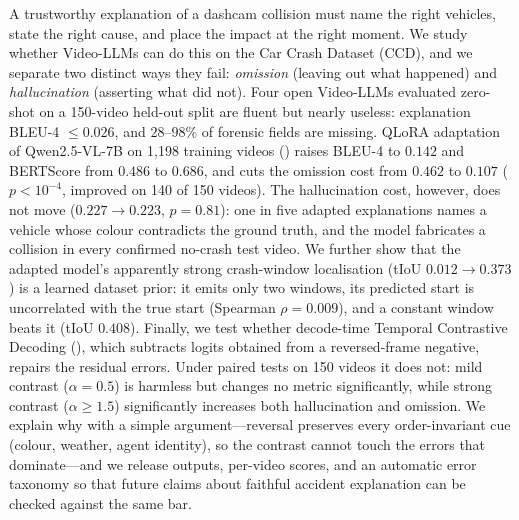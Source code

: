 A trustworthy explanation of a dashcam collision must name the right vehicles, state the right cause, and place the impact at the right moment.
We study whether Video-LLMs can do this on the Car Crash Dataset (CCD), and we separate two distinct ways they fail: \emph{omission} (leaving out what happened) and \emph{hallucination} (asserting what did not).
Four open Video-LLMs evaluated zero-shot on a 150-video held-out split are fluent but nearly useless: explanation BLEU-4 $\leq 0.026$, and $28$--$98\%$ of forensic fields are missing.
QLoRA adaptation of Qwen2.5-VL-7B on 1{,}198 training videos (\crashlogic) raises BLEU-4 to $0.142$ and BERTScore from $0.486$ to $0.686$, and cuts the omission cost from $0.462$ to $0.107$ ($p<10^{-4}$, improved on 140 of 150 videos).
The hallucination cost, however, does not move ($0.227\to0.223$, $p=0.81$): one in five adapted explanations names a vehicle whose colour contradicts the ground truth, and the model fabricates a collision in every confirmed no-crash test video.
We further show that the adapted model's apparently strong crash-window localisation (tIoU $0.012\to0.373$) is a learned dataset prior: it emits only two windows, its predicted start is uncorrelated with the true start (Spearman $\rho{=}0.009$), and a constant window beats it (tIoU $0.408$).
Finally, we test whether decode-time Temporal Contrastive Decoding (\tcd), which subtracts logits obtained from a reversed-frame negative, repairs the residual errors.
Under paired tests on 150 videos it does not: mild contrast ($\alpha{=}0.5$) is harmless but changes no metric significantly, while strong contrast ($\alpha{\geq}1.5$) significantly increases both hallucination and omission.
We explain why with a simple argument---reversal preserves every order-invariant cue (colour, weather, agent identity), so the contrast cannot touch the errors that dominate---and we release outputs, per-video scores, and an automatic error taxonomy so that future claims about faithful accident explanation can be checked against the same bar.
